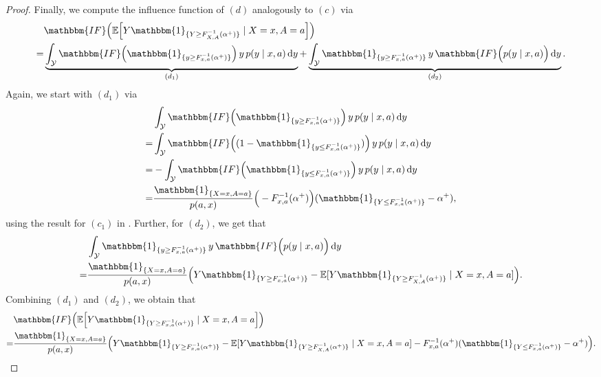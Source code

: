 \documentclass{article} %
\theoremstyle{plain}
\theoremstyle{definition}
\theoremstyle{remark}
\newcommand*\diff{\mathop{}\!\mathrm{d}}
\newcommand{\q}{F_{x,a}^{-1}}
\newcommand{\Q}{F_{X,A}^{-1}}
\newcommand{\indl}{\mathbbm{1}_{\{y\leq \q({\alpha^+})\}}}
\newcommand{\Indg}{\mathbbm{1}_{\{Y\geq \q({\alpha^+})\}}}
\newcommand{\indg}{\mathbbm{1}_{\{y\geq \q({\alpha^+})\}}}
\newcommand{\IndG}{\mathbbm{1}_{\{Y\geq \Q({\alpha^+})\}}}
\newcommand{\f}{\mathbbm{IF}}
\begin{document}
\begin{proof}
Finally, we compute the influence function of $(d)$ analogously to $(c)$ via
\begin{align}
    &\f \Big( \mathbb{E}\Big[Y \IndG \mid X=x,A=a\Big] \Big)\\
    = & \underbrace{\int_\mathcal{Y}  \f\Big(\indg \Big) \, y \, p(y\mid x,a) \diff y}_{(d_1)} + \underbrace{\int_\mathcal{Y} \indg \, y \, \f \Big( p(y\mid x,a)\Big) \diff y}_{(d_2)}.
\end{align}
Again, we start with $(d_1)$ via
\begin{align}
     &\int_\mathcal{Y}  \f\Big(\indg \Big) \, y \, p(y\mid x,a) \diff y\\
     =& \int_\mathcal{Y}  \f\Big((1-\indl ) \Big) \, y \, p(y\mid x,a) \diff y\\
     =& -\int_\mathcal{Y}  \f\Big(\indl \Big) \, y \, p(y\mid x,a) \diff y\\
     =& \frac{\mathbbm{1}_{\{X=x,A=a\}}}{p(a,x)}\Big( -\q({\alpha^+})\Big) (\mathbbm{1}_{\{Y\leq \q({\alpha^+})\}} - {\alpha^+}),\label{eq:if_di}
\end{align}
using the result for $(c_1)$ in . Further, for $(d_2)$, we get that
\begin{align}
    &\int_\mathcal{Y} \indg \, y \, \f \Big(  p(y\mid x,a)\Big) \diff y\\
    =& \frac{\mathbbm{1}_{\{X=x,A=a\}}}{p(a,x)} \Big( Y\Indg - \mathbb{E}[Y\IndG \mid X=x,A=a]\Big).\label{eq:if_dii}
\end{align}
Combining $(d_1)$ and $(d_2)$, we obtain that
\begin{align}
     &\f \Big( \mathbb{E}\Big[Y \Indg \mid X=x,A=a\Big] \Big)\\
     =& \frac{\mathbbm{1}_{\{X=x,A=a\}}}{p(a,x)} \Big(  Y\Indg - \mathbb{E}[Y\IndG \mid X=x,A=a] -\q({\alpha^+})(\mathbbm{1}_{\{Y\leq \q({\alpha^+})\}} - {\alpha^+})\Big).\label{eq:if_d}
\end{align}


\end{proof}
\end{document}
